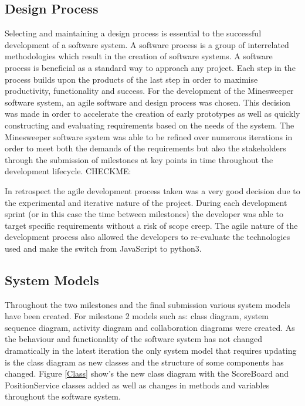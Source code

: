 \documentclass[12pt, a4]{report}
\begin{document}
\subsection{Design Process}
Selecting and maintaining a design process is essential to the successful development of a software system. A software process is a group of interrelated methodologies which result in the creation of software systems. A software process is beneficial as a standard way to approach any project. Each step in the process builds upon the products of the last step in order to maximise productivity, functionality and success. For the development of the Minesweeper software system, an agile software and design process was chosen. This decision was made in order to accelerate the creation of early prototypes as well as quickly constructing and evaluating requirements based on the needs of the system. The Minesweeper software system was able to be refined over numerous iterations in order to meet both the demands of the requirements but also the stakeholders through the submission of milestones at key points in time throughout the development lifecycle. 
\newline
CHECKME:
\par In retrospect the agile development process taken was a very good decision due to the experimental and iterative nature of the project. During each development sprint (or in this case the time between milestones) the developer was able to target specific requirements without a risk of scope creep. The agile nature of the development process also allowed the developers to re-evaluate the technologies used and make the switch from JavaScript to python3.

%
%	
\subsection{System Models}
Throughout the two milestones and the final submission various system models have been created. For milestone 2 models such as: class diagram, system sequence diagram, activity diagram and collaboration diagrams were created. As the behaviour and functionality of the software system has not changed dramatically in the latest iteration the only system model that requires updating is the class diagram as new classes and the structure of some components has changed. Figure \ref{Class} show's the new class diagram with the ScoreBoard and PositionService classes added as well as changes in methods and variables throughout the software system.
\end{document}

